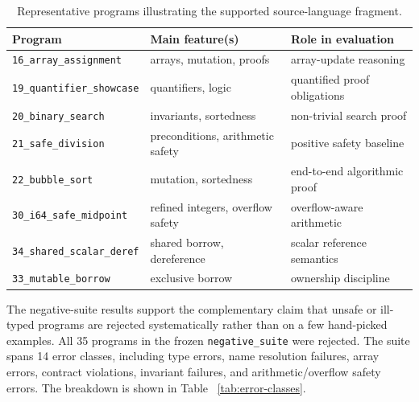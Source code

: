 \begin{table}[h]
  \centering
  \begin{tabular}{l l l}
    \hline
    \textbf{Program}                  & \textbf{Main feature(s)} & \textbf{Role in evaluation}   \\
    \hline
    \texttt{16\_array\_assignment}    & arrays, mutation, proofs & array-update reasoning        \\
    \texttt{19\_quantifier\_showcase} & quantifiers, logic       & quantified proof obligations  \\
    \texttt{20\_binary\_search}       & invariants, sortedness   & non-trivial search proof      \\
    \texttt{21\_safe\_division}       & preconditions, arithmetic safety & positive safety baseline \\
    \texttt{22\_bubble\_sort}         & mutation, sortedness     & end-to-end algorithmic proof  \\
    \texttt{30\_i64\_safe\_midpoint}  & refined integers, overflow safety & overflow-aware arithmetic \\
    \texttt{34\_shared\_scalar\_deref} & shared borrow, dereference & scalar reference semantics \\
    \texttt{33\_mutable\_borrow}      & exclusive borrow         & ownership discipline          \\
    \hline
  \end{tabular}
  \caption{Representative programs illustrating the supported source-language
    fragment.}
  \label{tab:expressive-programs}
\end{table}

The negative-suite results support the complementary claim that unsafe or
ill-typed programs are rejected systematically rather than on a few hand-picked
examples. All 35 programs in the frozen \texttt{negative\_suite} were
rejected. The suite spans 14 error classes, including type errors, name
resolution failures, array errors, contract violations, invariant failures, and
arithmetic/overflow safety errors. The breakdown is shown in Table
~\ref{tab:error-classes}.

